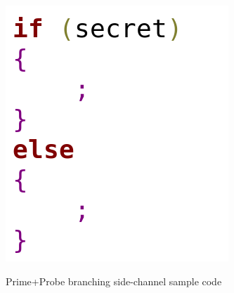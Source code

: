 \begin{algorithm}[t]
	\includegraphics[scale=0.25]{images/alg}
	\caption{Prime+Probe branching side-channel sample code \cite{stealthy,cloak}}
	\label{alg:one}
\end{algorithm}

